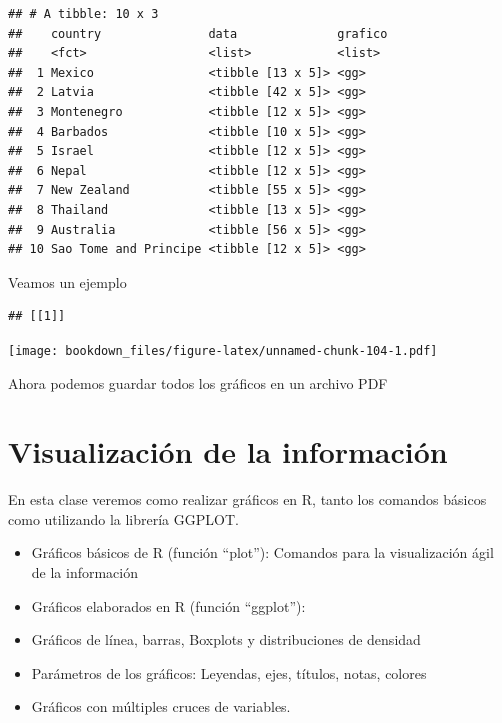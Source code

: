 \documentclass[]{book}
\newenvironment{Shaded}{\begin{snugshade}}{\end{snugshade}}
\newcommand{\DecValTok}[1]{\textcolor[rgb]{0.00,0.00,0.81}{#1}}
\newcommand{\KeywordTok}[1]{\textcolor[rgb]{0.13,0.29,0.53}{\textbf{#1}}}
\newcommand{\NormalTok}[1]{#1}
\newcommand{\OperatorTok}[1]{\textcolor[rgb]{0.81,0.36,0.00}{\textbf{#1}}}
\newcommand{\StringTok}[1]{\textcolor[rgb]{0.31,0.60,0.02}{#1}}
\providecommand{\tightlist}{%
  \setlength{\itemsep}{0pt}\setlength{\parskip}{0pt}}
\begin{document}
\begin{verbatim}
## # A tibble: 10 x 3
##    country               data              grafico
##    <fct>                 <list>            <list> 
##  1 Mexico                <tibble [13 x 5]> <gg>   
##  2 Latvia                <tibble [42 x 5]> <gg>   
##  3 Montenegro            <tibble [12 x 5]> <gg>   
##  4 Barbados              <tibble [10 x 5]> <gg>   
##  5 Israel                <tibble [12 x 5]> <gg>   
##  6 Nepal                 <tibble [12 x 5]> <gg>   
##  7 New Zealand           <tibble [55 x 5]> <gg>   
##  8 Thailand              <tibble [13 x 5]> <gg>   
##  9 Australia             <tibble [56 x 5]> <gg>   
## 10 Sao Tome and Principe <tibble [12 x 5]> <gg>
\end{verbatim}

Veamos un ejemplo

\begin{Shaded}
\end{Shaded}

\begin{verbatim}
## [[1]]
\end{verbatim}

\texttt{[image: bookdown\_files/figure-latex/unnamed-chunk-104-1.pdf]}

Ahora podemos guardar todos los gráficos en un archivo PDF

\begin{Shaded}
\end{Shaded}

\hypertarget{visualizacion-de-la-informacion}{%
\chapter{Visualización de la información}\label{visualizacion-de-la-informacion}}

En esta clase veremos como realizar gráficos en R, tanto los comandos básicos como utilizando la librería GGPLOT.

\begin{itemize}
\tightlist
\item
  Gráficos básicos de R (función ``plot''): Comandos para la visualización ágil de la información
\item
  Gráficos elaborados en R (función ``ggplot''):
\item
  Gráficos de línea, barras, Boxplots y distribuciones de densidad
\item
  Parámetros de los gráficos: Leyendas, ejes, títulos, notas, colores
\item
  Gráficos con múltiples cruces de variables.
\end{itemize}
\end{document}
